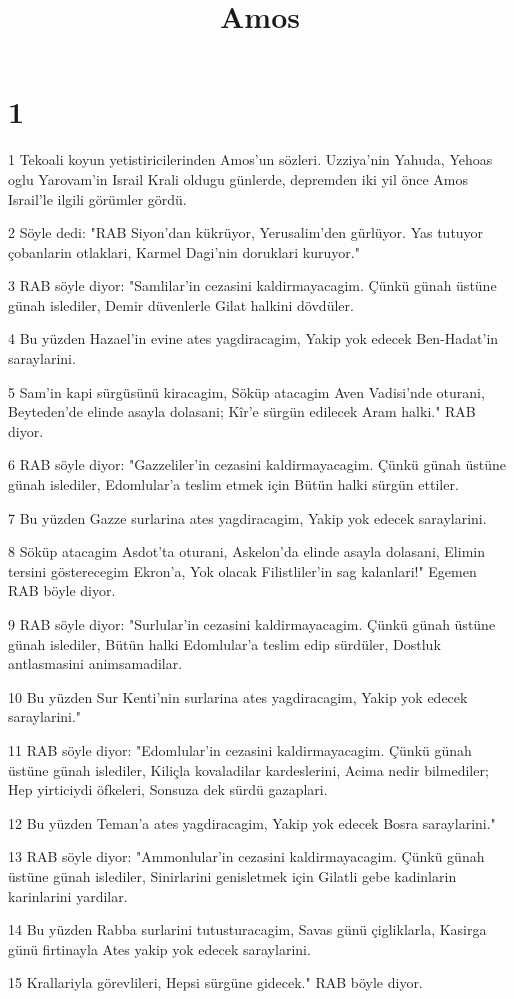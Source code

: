 

\title{Amos}


\chapter{1}

\par 1 Tekoali koyun yetistiricilerinden Amos'un sözleri. Uzziya'nin Yahuda, Yehoas oglu Yarovam'in Israil Krali oldugu günlerde, depremden iki yil önce Amos Israil'le ilgili görümler gördü.
\par 2 Söyle dedi: "RAB Siyon'dan kükrüyor, Yerusalim'den gürlüyor. Yas tutuyor çobanlarin otlaklari, Karmel Dagi'nin doruklari kuruyor."
\par 3 RAB söyle diyor: "Samlilar'in cezasini kaldirmayacagim. Çünkü günah üstüne günah islediler, Demir düvenlerle Gilat halkini dövdüler.
\par 4 Bu yüzden Hazael'in evine ates yagdiracagim, Yakip yok edecek Ben-Hadat'in saraylarini.
\par 5 Sam'in kapi sürgüsünü kiracagim, Söküp atacagim Aven Vadisi'nde oturani, Beyteden'de elinde asayla dolasani; Kîr'e sürgün edilecek Aram halki." RAB diyor.
\par 6 RAB söyle diyor: "Gazzeliler'in cezasini kaldirmayacagim. Çünkü günah üstüne günah islediler, Edomlular'a teslim etmek için Bütün halki sürgün ettiler.
\par 7 Bu yüzden Gazze surlarina ates yagdiracagim, Yakip yok edecek saraylarini.
\par 8 Söküp atacagim Asdot'ta oturani, Askelon'da elinde asayla dolasani, Elimin tersini gösterecegim Ekron'a, Yok olacak Filistliler'in sag kalanlari!" Egemen RAB böyle diyor.
\par 9 RAB söyle diyor: "Surlular'in cezasini kaldirmayacagim. Çünkü günah üstüne günah islediler, Bütün halki Edomlular'a teslim edip sürdüler, Dostluk antlasmasini animsamadilar.
\par 10 Bu yüzden Sur Kenti'nin surlarina ates yagdiracagim, Yakip yok edecek saraylarini."
\par 11 RAB söyle diyor: "Edomlular'in cezasini kaldirmayacagim. Çünkü günah üstüne günah islediler, Kiliçla kovaladilar kardeslerini, Acima nedir bilmediler; Hep yirticiydi öfkeleri, Sonsuza dek sürdü gazaplari.
\par 12 Bu yüzden Teman'a ates yagdiracagim, Yakip yok edecek Bosra saraylarini."
\par 13 RAB söyle diyor: "Ammonlular'in cezasini kaldirmayacagim. Çünkü günah üstüne günah islediler, Sinirlarini genisletmek için Gilatli gebe kadinlarin karinlarini yardilar.
\par 14 Bu yüzden Rabba surlarini tutusturacagim, Savas günü çigliklarla, Kasirga günü firtinayla Ates yakip yok edecek saraylarini.
\par 15 Krallariyla görevlileri, Hepsi sürgüne gidecek." RAB böyle diyor.

